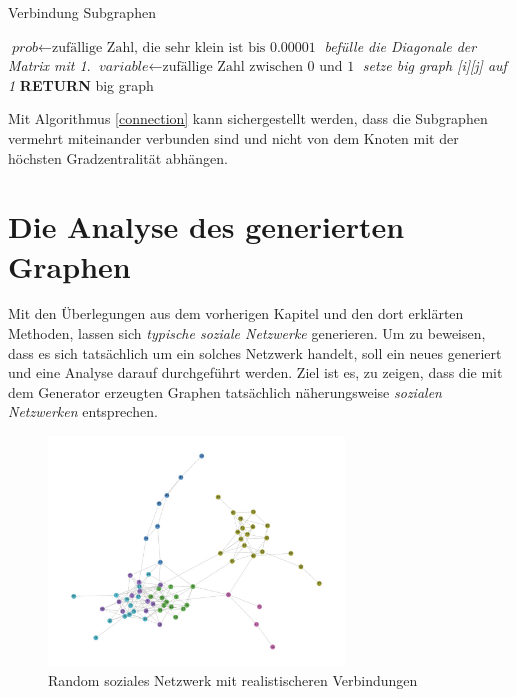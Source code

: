 \begin{algorithm}
\caption{Verbindung Subgraphen}\label{connection}
\begin{algorithmic}[1]
\State $\textit{prob} \gets \text{zufällige Zahl, die sehr klein ist bis 0.00001}$
\State \textit{befülle die Diagonale der Matrix mit 1}.
\EndFor
{}
\State $\textit{variable} \gets \text{zufällige Zahl zwischen 0 und 1}$
\State \textit{setze big graph [i][j] auf 1}
\EndIf
\EndFor
\EndFor
\textbf{RETURN} big graph
\EndProcedure
\end{algorithmic}
\end{algorithm}

Mit Algorithmus \ref{connection} kann sichergestellt werden, dass die Subgraphen vermehrt miteinander verbunden sind und nicht von dem Knoten mit der höchsten Gradzentralität abhängen.

\section{Die Analyse des generierten Graphen}
Mit den Überlegungen aus dem vorherigen Kapitel und den dort erklärten Methoden, lassen sich \textit{typische soziale Netzwerke} generieren. Um zu beweisen, dass es sich tatsächlich um ein solches Netzwerk handelt, soll ein neues generiert und eine Analyse darauf durchgeführt werden. Ziel ist es, zu zeigen, dass die mit dem Generator erzeugten Graphen tatsächlich näherungsweise \textit{sozialen Netzwerken} entsprechen.

\FloatBarrier
\begin{figure}[h!]
    \centering
    \hspace*{-2cm}
    \includegraphics[width=0.7\textwidth]{Graphics/Random_moreConnections.jpg}
    \caption{Random soziales Netzwerk mit realistischeren Verbindungen}
    \label{fig:SNA}
\end{figure}

